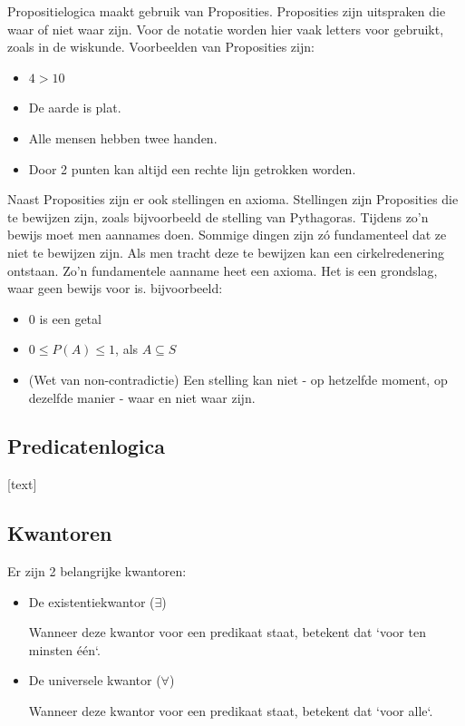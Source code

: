 \documentclass{article}
\begin{document}
		Propositielogica maakt gebruik van Proposities. Proposities zijn uitspraken die waar of niet waar zijn. Voor de notatie worden hier vaak letters voor gebruikt, zoals in de wiskunde. Voorbeelden van Proposities zijn:

		\begin{itemize}
			\item \( 4 > 10 \)
			\item De aarde is plat.
			\item Alle mensen hebben twee handen.
			\item Door 2 punten kan altijd een rechte lijn getrokken worden.
		\end{itemize}

		Naast Proposities zijn er ook stellingen en axioma. Stellingen zijn Proposities die te bewijzen zijn, zoals bijvoorbeeld de stelling van Pythagoras. Tijdens zo'n bewijs moet men aannames doen. Sommige dingen zijn zó fundamenteel dat ze niet te bewijzen zijn. Als men tracht deze te bewijzen kan een cirkelredenering ontstaan. Zo'n fundamentele aanname heet een axioma. Het is een grondslag, waar geen bewijs voor is. bijvoorbeeld:

		\begin{itemize}
			\item 0 is een getal
			\item \( 0 \leq P(A) \leq 1 \), als \( A \subseteq S \)
			\item (Wet van non-contradictie) Een stelling kan niet - op hetzelfde moment, op dezelfde manier - waar en niet waar zijn.
		\end{itemize}
		
		\subsection{Predicatenlogica}
		
		[text]
		
		\subsection{Kwantoren}
		
		Er zijn 2 belangrijke kwantoren:

		\begin{itemize}
			\item De existentiekwantor (\( \exists \))

			Wanneer deze kwantor voor een predikaat staat, betekent dat `voor ten minsten één`.

			\item De universele kwantor (\( \forall \))

			Wanneer deze kwantor voor een predikaat staat, betekent dat `voor alle`.
		\end{itemize}
\end{document}
